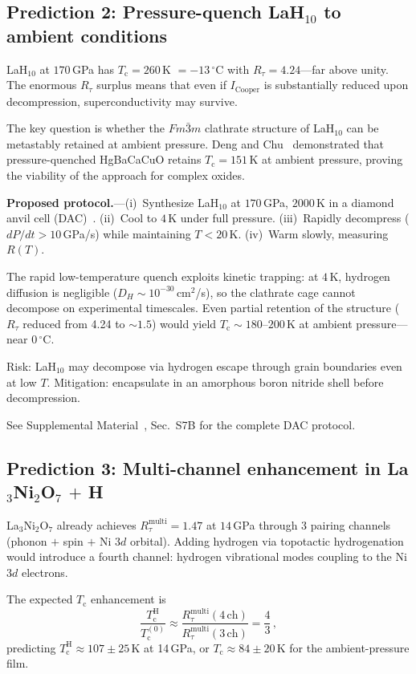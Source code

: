 \documentclass[prb,twocolumn,superscriptaddress,longbibliography,floatfix]{revtex4-2}
\newcommand{\tauasym}{\tau}
\newcommand{\Icoop}{I_{\mathrm{Cooper}}}
\newcommand{\Rtau}{R_{\tauasym}}
\newcommand{\Tc}{T_{\mathrm{c}}}
\begin{document}
\subsection{Prediction 2: Pressure-quench LaH$_{10}$ to
ambient conditions}

LaH$_{10}$ at $170\,$GPa has $\Tc = 260\,$K $= -13\,^\circ$C
with $\Rtau = 4.24$---far above unity.  The enormous $\Rtau$
surplus means that even if $\Icoop$ is substantially reduced
upon decompression, superconductivity may survive.

The key question is whether the $Fm\bar{3}m$ clathrate structure
of LaH$_{10}$ can be metastably retained at ambient pressure.
Deng and Chu~\cite{DengChu2026} demonstrated that
pressure-quenched HgBaCaCuO retains $\Tc = 151\,$K at
ambient pressure, proving the viability of the approach for
complex oxides.

\textbf{Proposed protocol.}---(i)~Synthesize LaH$_{10}$ at
$170\,$GPa, $2000\,$K in a diamond anvil cell
(DAC)~\cite{Drozdov2019}.  (ii)~Cool to $4\,$K under full
pressure.  (iii)~Rapidly decompress ($dP/dt > 10\,$GPa/s)
while maintaining $T < 20\,$K.  (iv)~Warm slowly, measuring
$R(T)$.

The rapid low-temperature quench exploits kinetic trapping:
at $4\,$K, hydrogen diffusion is negligible
($D_H \sim 10^{-30}\,$cm$^2$/s), so the clathrate cage
cannot decompose on experimental timescales.  Even partial
retention of the structure ($\Rtau$ reduced from 4.24 to
$\sim 1.5$) would yield $\Tc \sim 180$--$200\,$K at
ambient pressure---near $0\,^\circ$C.

Risk: LaH$_{10}$ may decompose via hydrogen escape through
grain boundaries even at low $T$.  Mitigation: encapsulate
in an amorphous boron nitride shell before decompression.

See Supplemental Material~\cite{supplement}, Sec.~S7B for the
complete DAC protocol.

\subsection{Prediction 3: Multi-channel enhancement in
La$_3$Ni$_2$O$_7$ $+$ H}

La$_3$Ni$_2$O$_7$ already achieves
$\Rtau^{\mathrm{multi}} = 1.47$ at $14\,$GPa through
3 pairing channels (phonon $+$ spin $+$ Ni $3d$ orbital).
Adding hydrogen via topotactic hydrogenation would introduce
a fourth channel: hydrogen vibrational modes coupling to the
Ni $3d$ electrons.

The expected $\Tc$ enhancement is
\begin{equation}\label{eq:Tc_enhanced}
  \frac{\Tc^{\mathrm{H}}}{\Tc^{(0)}} \approx
  \frac{\Rtau^{\mathrm{multi}}(4\,\text{ch})}
  {\Rtau^{\mathrm{multi}}(3\,\text{ch})}
  = \frac{4}{3}\,,
\end{equation}
predicting $\Tc^{\mathrm{H}} \approx 107 \pm 25\,$K at 14\,GPa,
or $\Tc \approx 84 \pm 20\,$K for the ambient-pressure film.
\end{document}
